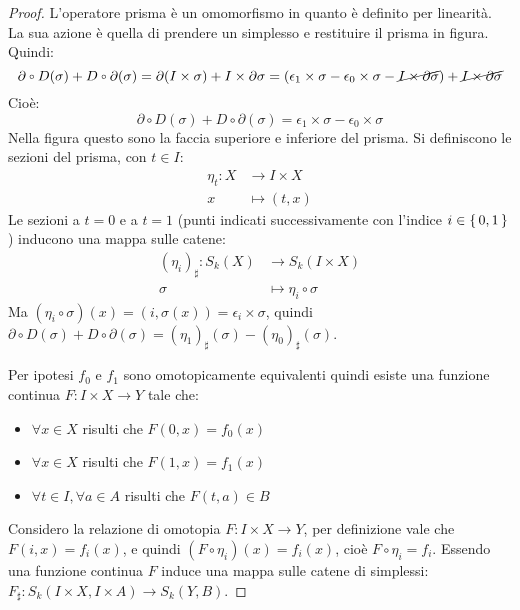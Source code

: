 \begin{proof}
  L'operatore prisma è un omomorfismo in quanto è definito per linearità. La sua
  azione è quella di prendere un simplesso e restituire il prisma in figura.
  Quindi:
  \[
    \partial \circ D (\sigma) + D \circ \partial (\sigma) = \partial (I \times \sigma) + I \times \partial \sigma = (\epsilon_1 \times \sigma - \epsilon_0 \times \sigma - \cancel{I \times \partial \sigma})
    + \cancel{I \times \partial \sigma}
  \]
  Cioè:
  \[
    \partial \circ D (\sigma) + D \circ \partial (\sigma) = \epsilon_1 \times \sigma - \epsilon_0 \times \sigma
  \]
  Nella figura questo sono la faccia superiore e inferiore del prisma.
  Si definiscono le sezioni del prisma, con $ t \in I $:
  \begin{align*}
    \eta_t  \colon X & \to I \times X \\
    x & \mapsto (t,x)
  \end{align*}
  Le sezioni a $ t = 0 $ e a $ t = 1 $ (punti indicati successivamente con
  l'indice $ i \in \set{0,1} $) inducono una mappa sulle catene:
  \begin{align*}
    (\eta_i)_\sharp \colon S_k(X) & \to S_k(I \times X) \\
    \sigma & \mapsto \eta_i \circ \sigma
  \end{align*}
  Ma $ (\eta_i \circ \sigma)(x) = (i, \sigma(x)) = \epsilon_i \times \sigma $, quindi
  $ \partial \circ D (\sigma) + D \circ \partial (\sigma) = (\eta_1)_\sharp(\sigma) - (\eta_0)_\sharp(\sigma) $.

  Per ipotesi $ f_0 $ e $ f_1 $ sono omotopicamente equivalenti quindi esiste
  una funzione continua $ F \colon I \times X \to Y $ tale che:
  \begin{itemize}
  \item $ \forall x \in X $ risulti che $ F(0,x) = f_0(x) $
  \item $ \forall x \in X $ risulti che $ F(1,x) = f_1(x) $
  \item $ \forall t \in I, \forall a \in A $ risulti che  $ F(t,a) \in B $
  \end{itemize}
  Considero la relazione di omotopia $ F \colon I \times X \to Y $, per definizione vale che
  $ F(i,x) = f_i(x) $, e quindi $ (F \circ \eta_i)(x) = f_i(x) $, cioè
  $ F \circ \eta_i = f_i $. Essendo una funzione continua $ F $ induce una mappa sulle
  catene di simplessi: $ F_\sharp \colon S_k(I \times X, I \times A) \to S_k(Y,B) $.


\end{proof}
